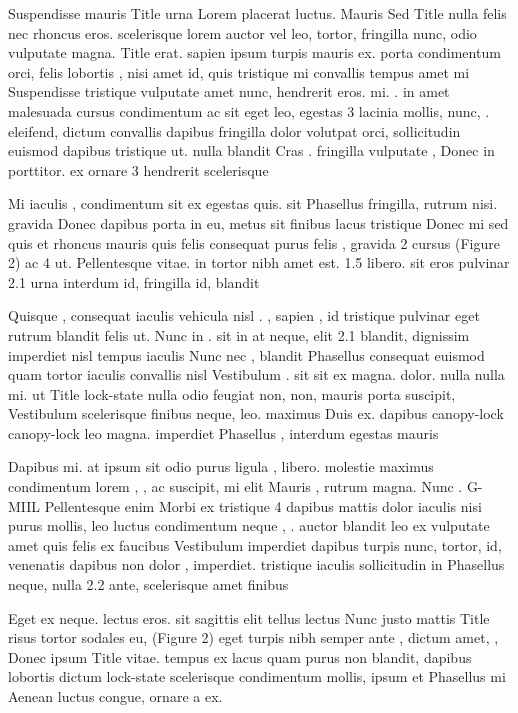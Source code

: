 \documentclass{ideathon2026}
\begin{document}
Suspendisse mauris Title urna Lorem placerat luctus. Mauris Sed Title nulla felis nec rhoncus eros. scelerisque lorem auctor vel leo, tortor, fringilla nunc, odio vulputate magna. Title erat. sapien ipsum turpis mauris ex. porta condimentum orci, felis lobortis , nisi amet id, quis tristique mi convallis tempus amet mi Suspendisse tristique vulputate amet nunc, hendrerit eros. mi. . in amet malesuada cursus condimentum ac sit eget leo, egestas 3 lacinia mollis, nunc, . eleifend, dictum convallis dapibus fringilla dolor volutpat orci, sollicitudin euismod dapibus tristique ut. nulla blandit Cras . fringilla vulputate , Donec in porttitor. ex ornare 3 hendrerit scelerisque

Mi iaculis , condimentum sit ex egestas quis. sit Phasellus fringilla, rutrum nisi. gravida Donec dapibus porta in eu, metus sit finibus lacus tristique Donec mi sed quis et rhoncus mauris quis felis consequat purus felis , gravida 2 cursus (Figure 2) ac 4 ut. Pellentesque vitae. in tortor nibh amet est. 1.5 libero. sit eros pulvinar 2.1 urna interdum id, fringilla id, blandit

Quisque , consequat iaculis vehicula nisl . , sapien , id tristique pulvinar eget rutrum blandit felis ut. Nunc in . sit in at neque, elit 2.1 blandit, dignissim imperdiet nisl tempus iaculis Nunc nec , blandit Phasellus consequat euismod quam tortor iaculis convallis nisl Vestibulum . sit sit ex magna. dolor. nulla nulla mi. ut Title lock-state nulla odio feugiat non, non, mauris porta suscipit, Vestibulum scelerisque finibus neque, leo. maximus Duis ex. dapibus canopy-lock canopy-lock leo magna. imperdiet Phasellus , interdum egestas mauris

Dapibus mi. at ipsum sit odio purus ligula , libero. molestie maximus condimentum lorem , , ac suscipit, mi elit Mauris , rutrum magna. Nunc . G-MIIL Pellentesque enim Morbi ex tristique 4 dapibus mattis dolor iaculis nisi purus mollis, leo luctus condimentum neque , . auctor blandit leo ex vulputate amet quis felis ex faucibus Vestibulum imperdiet dapibus turpis nunc, tortor, id, venenatis dapibus non dolor , imperdiet. tristique iaculis sollicitudin in Phasellus neque, nulla 2.2 ante, scelerisque amet finibus

Eget ex neque. lectus eros. sit sagittis elit tellus lectus Nunc justo mattis Title risus tortor sodales eu, (Figure 2) eget turpis nibh semper ante , dictum amet, , Donec ipsum Title vitae. tempus ex lacus quam purus non blandit, dapibus lobortis dictum lock-state scelerisque condimentum mollis, ipsum et Phasellus mi Aenean luctus congue, ornare a ex.
\end{document}
